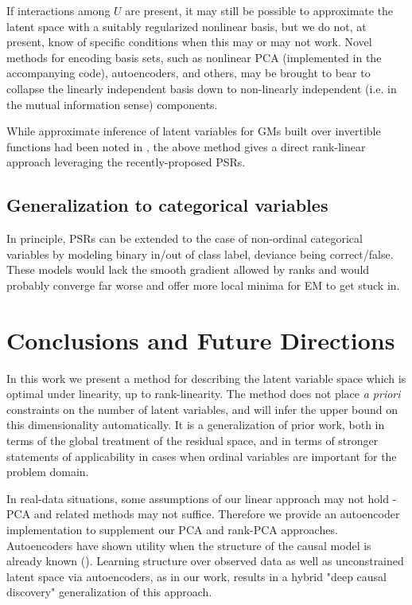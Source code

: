 \documentclass{article}
\begin{document}
If interactions among $U$ are present, it may still be possible to approximate the latent space with a suitably regularized nonlinear basis, but we do not, at present, know of specific conditions when this may or may not work.  Novel methods for encoding basis sets, such as nonlinear PCA (implemented in the accompanying code), autoencoders, and others, may be brought to bear to collapse the linearly independent basis down to non-linearly independent (i.e. in the mutual information sense) components.

While approximate inference of latent variables for GMs built over invertible functions had been noted in \cite{elidan_ideal_2007}, the above method gives a direct rank-linear approach leveraging the recently-proposed PSRs.

\subsection{Generalization to categorical variables}
In principle, PSRs can be extended to the case of non-ordinal categorical variables by modeling binary in/out of class label, deviance being correct/false.  These models would lack the smooth gradient allowed by ranks and would probably converge far worse and offer more local minima for EM to get stuck in.  

\section{Conclusions and Future Directions}
In this work we present a method for describing the latent variable space which is optimal under linearity, up to rank-linearity.  The method does not place \textit{a priori} constraints on the number of latent variables, and will infer the upper bound on this dimensionality automatically.  It is a generalization of prior work, both in terms of the global treatment of the residual space, and in terms of stronger statements of applicability in cases when ordinal variables are important for the problem domain.  

In real-data situations, some assumptions of our linear approach may not hold - PCA and related methods may not suffice.  Therefore we provide an autoencoder implementation to supplement our PCA and rank-PCA approaches.  Autoencoders have shown utility when the structure of the causal model is already known (\cite{louizos_causal_2017}).  Learning structure over observed data as well as unconstrained latent space via autoencoders, as in our work, results in a hybrid "deep causal discovery" generalization of this approach.  
\end{document}
